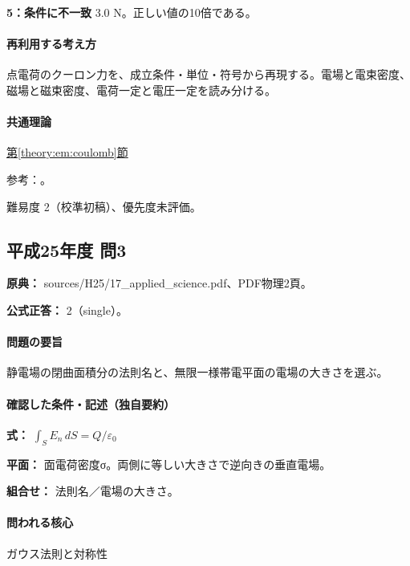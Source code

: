 \noindent\textbf{5：条件に不一致} 3.0 N。正しい値の10倍である。\par

\paragraph{再利用する考え方} 点電荷のクーロン力を、成立条件・単位・符号から再現する。電場と電束密度、磁場と磁束密度、電荷一定と電圧一定を読み分ける。

\paragraph{共通理論} \hyperref[theory:em:coulomb]{第\ref*{theory:em:coulomb}節}

\par 参考：\cite{mit_em02}。

\par 難易度 2（校準初稿）、優先度未評価。

\subsection{平成25年度 問3}
\label{q:h25-reg-applied-03}

\noindent\textbf{原典：} sources/H25/17\_applied\_science.pdf、PDF物理2頁。

\textbf{公式正答：} 2（single）。

\paragraph{問題の要旨} 静電場の閉曲面積分の法則名と、無限一様帯電平面の電場の大きさを選ぶ。

\paragraph{確認した条件・記述（独自要約）}\mbox{}\par

\noindent\textbf{式：} \(\int_S E_n\,dS=Q/\varepsilon_0\)\par

\noindent\textbf{平面：} 面電荷密度σ。両側に等しい大きさで逆向きの垂直電場。\par

\noindent\textbf{組合せ：} 法則名／電場の大きさ。\par

\paragraph{問われる核心} ガウス法則と対称性

